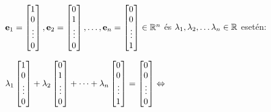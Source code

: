 \documentclass[a4paper,11.5pt]{article}
\begin{document}
	{\centering
		$\e _1=\begin{bmatrix}
	1\s \\
	0\s \\
	\vdots\\
	0\s \\
	\end{bmatrix},
	\e _2=\begin{bmatrix}
	0\s \\
	1\s \\
	\vdots\\
	0\s \\
	\end{bmatrix}, \dots ,
	\e _n=\begin{bmatrix}
	0\s \\
	0\s \\
	\vdots\\
	1\s \\
	\end{bmatrix} \in \Rn $ és $\lambda_1, \lambda_2, \ldots \lambda_n \in \mathbb{R}$ esetén:
	
	$\l_1\begin{bmatrix}
	1\s \\
	0\s \\
	\vdots\\
	0\s \\
	\end{bmatrix}+
	\l_2\begin{bmatrix}
	0\s \\
	1\s \\
	\vdots\\
	0\s \\
	\end{bmatrix}+ \dots+
	\l_n\begin{bmatrix}
	0\s \\
	0\s \\
	\vdots\\
	1\s \\
	\end{bmatrix}=
	\begin{bmatrix}
	0\s \\
	0\s \\
	\vdots\\
	0\s \\
	\end{bmatrix} \Leftrightarrow$
	
}
\end{document}
